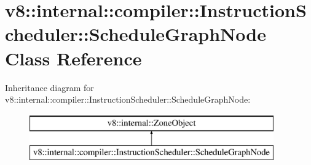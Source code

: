 \hypertarget{classv8_1_1internal_1_1compiler_1_1_instruction_scheduler_1_1_schedule_graph_node}{}\section{v8\+:\+:internal\+:\+:compiler\+:\+:Instruction\+Scheduler\+:\+:Schedule\+Graph\+Node Class Reference}
\label{classv8_1_1internal_1_1compiler_1_1_instruction_scheduler_1_1_schedule_graph_node}
Inheritance diagram for v8\+:\+:internal\+:\+:compiler\+:\+:Instruction\+Scheduler\+:\+:Schedule\+Graph\+Node\+:\begin{figure}[H]
\begin{center}
\leavevmode
\includegraphics[height=2.000000cm]{classv8_1_1internal_1_1compiler_1_1_instruction_scheduler_1_1_schedule_graph_node}
\end{center}
\end{figure}

